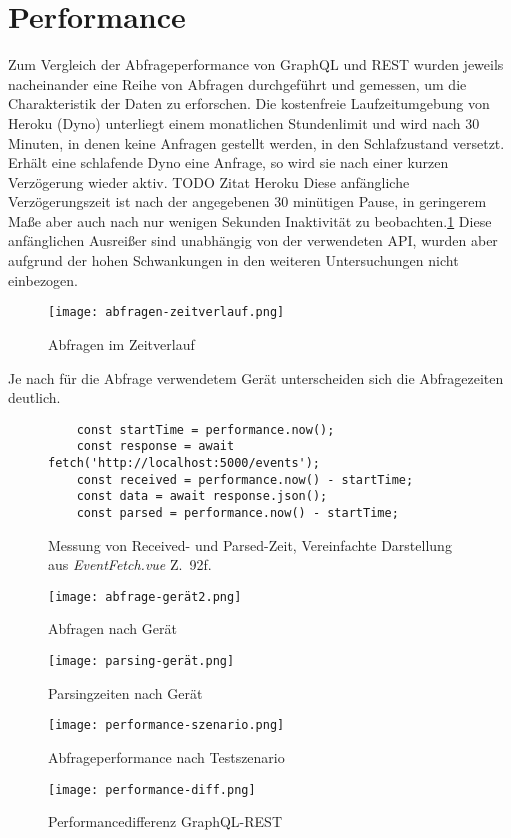 \section{Performance}
Zum Vergleich der Abfrageperformance von GraphQL und REST wurden jeweils nacheinander eine Reihe von Abfragen durchgeführt und gemessen, um die Charakteristik der Daten zu erforschen.
Die kostenfreie Laufzeitumgebung von Heroku (Dyno) unterliegt einem monatlichen Stundenlimit und wird nach 30 Minuten, in denen keine Anfragen gestellt werden, in den Schlafzustand versetzt.
Erhält eine schlafende Dyno eine Anfrage, so wird sie nach einer kurzen Verzögerung wieder aktiv. TODO Zitat Heroku
Diese anfängliche Verzögerungszeit ist nach der angegebenen 30 minütigen Pause, in geringerem Maße aber auch nach nur wenigen Sekunden Inaktivität zu beobachten.\ref{img:abfrage-zeitverlauf}
Diese anfänglichen Ausreißer sind unabhängig von der verwendeten API, wurden aber aufgrund der hohen Schwankungen in den weiteren Untersuchungen nicht einbezogen. 
\begin{figure}[h!]
  \centering
  \texttt{[image: abfragen-zeitverlauf.png]}
  \caption{Abfragen im Zeitverlauf}\label{img:abfrage-zeitverlauf}
\end{figure}
Je nach für die Abfrage verwendetem Gerät unterscheiden sich die Abfragezeiten deutlich.
\begin{figure}[h]
  \centering
  \begin{verbatim}
    const startTime = performance.now();
    const response = await fetch('http://localhost:5000/events');
    const received = performance.now() - startTime;
    const data = await response.json();
    const parsed = performance.now() - startTime;
  \end{verbatim}
  \caption{Messung von Received- und Parsed-Zeit, Vereinfachte Darstellung aus \emph{EventFetch.vue} Z.~92f.}\label{Test}
\end{figure}
\begin{figure}[h!]
  \centering
  \texttt{[image: abfrage-gerät2.png]}
  \caption{Abfragen nach Gerät}\label{img:abfrage-gerät}
\end{figure}
\begin{figure}[h!]
  \centering
  \texttt{[image: parsing-gerät.png]}
  \caption{Parsingzeiten nach Gerät}\label{img:parsing-gerät}
\end{figure}
\begin{figure}[h!]
  \centering
  \texttt{[image: performance-szenario.png]}
  \caption{Abfrageperformance nach Testszenario}\label{img:performance-szenario}
\end{figure}
\begin{figure}[h!]
  \centering
  \texttt{[image: performance-diff.png]}
  \caption{Performancedifferenz GraphQL-REST}\label{img:performance-diff}
\end{figure}

